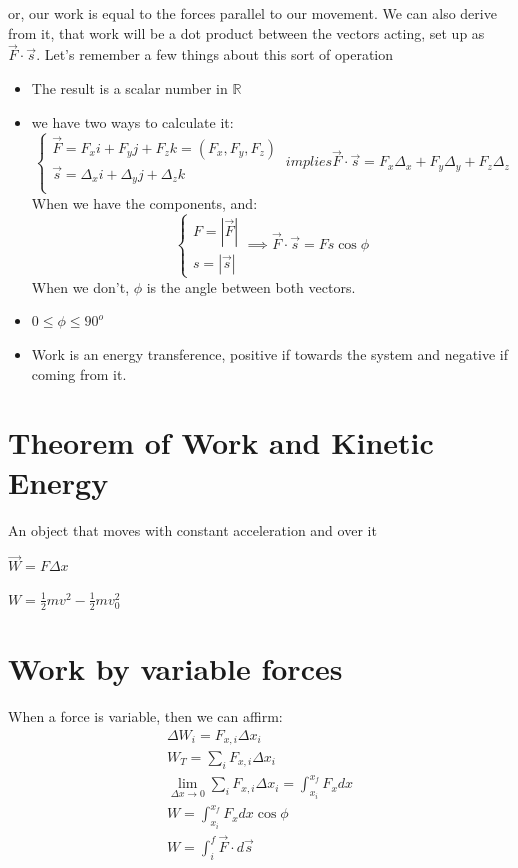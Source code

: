 \documentclass[11pt,fleqn]{book} %
\begin{document}
or, our work is equal to the forces parallel to our movement. We can also derive from it, that work will be a 
dot product between the vectors acting, set up as $\vec{F} \cdot \vec{s}$. Let's remember a few things about this sort of
operation
\begin{itemize}
    \item The result is a scalar number in $\mathbb{R}$
    \item we have two ways to calculate it: $$
    \begin{cases}
        \vec{F} = F_x i + F_y j + F_z k = (F_x, F_y, F_z)\\
        \vec{s} = \Delta_x i + \Delta_y j + \Delta_z k \\
    \end{cases} \ implies \vec{F} \cdot \vec{s} = F_x \Delta_x + F_y \Delta_y + F_z \Delta_z
    $$
    When we have the components, and:
    $$
    \begin{cases}
        F = |\vec{F}|\\
        s = |\vec{s}|
    \end{cases} \implies \vec{F} \cdot \vec{s} = Fs \cos{\phi}
    $$ When we don't, $\phi$ is the angle between both vectors.
    \item $0 \leq \phi \leq 90^o$
    \item Work is an energy transference, positive if towards the system and negative if coming from it.
\end{itemize}

\section{Theorem of Work and Kinetic Energy}

An object that moves with constant acceleration and over it 

$\vec{W} = F \Delta x$

$W = \frac{1}{2}mv^2 - \frac{1}{2}mv_0^2$

\section{Work by variable forces}
When a force is variable, then we can affirm:
\begin{gather}
    \Delta W_i = F_{x,i} \Delta x_i\\
    W_T = \sum_i F_{x,i} \Delta x_i\\
    \lim_{\Delta x \to 0} \sum_i F_{x,i} \Delta x_i = \int_{x_i}^{x_f} F_x dx\\
    W = \int_{x_i}^{x_f} F_x dx \cos{\phi}\\
    W = \int_{i}^{f} \vec{F} \cdot d\vec{s}
\end{gather}
\end{document}
